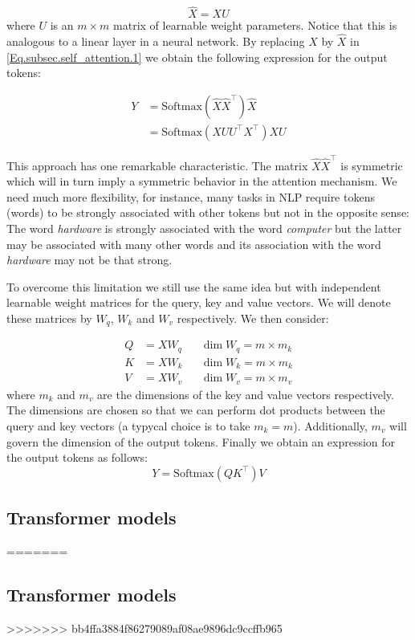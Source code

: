     \[ \widehat{X} = X U \]
    where $U$ is an $m \times m$ matrix of learnable weight parameters. Notice that this is analogous to a linear layer in a neural network. By replacing $X$ by $\widehat{X}$ in \eqref{Eq.subsec.self_attention.1} we obtain the following expression for the output tokens:

    \begin{align}\label{Eq.subsec.self_attention.2}
        Y &= \textrm{Softmax}(\widehat{X} \widehat{X}^\top) \widehat{X} \nonumber \\
        &= \textrm{Softmax}(X U U^\top X^\top) X U 
    \end{align}

    \begin{remark}
        This approach has one remarkable characteristic. The matrix $\widehat{X}\widehat{X}^\top$ is symmetric which will in turn imply a symmetric behavior in the attention mechanism. We need much more flexibility, for instance, many tasks in NLP require tokens (words) to be strongly associated with other tokens but not in the opposite sense: The word \textit{hardware} is strongly associated with the word \textit{computer} but the latter may be associated with many other words and its association with the word \textit{hardware} may not be that strong. 
    \end{remark}

    To overcome this limitation we still use the same idea but with independent learnable weight matrices for the query, key and value vectors. We will denote these matrices by $W_q$, $W_k$ and $W_v$ respectively. We then consider: 

    \begin{align*}
        Q &= X W_q  &&\dim W_q = m\times m_k \\ 
        K &= X W_k  &&\dim W_k = m\times m_k \\
        V &= X W_v &&\dim W_v = m\times m_v
    \end{align*}
    where $m_k$ and $m_v$ are the dimensions of the key and value vectors respectively. The dimensions are chosen so that we can perform dot products between the query and key vectors (a typycal choice is to take $m_k= m$). Additionally, $m_v$ will govern the dimension of the output tokens. Finally we obtain an expression for the output tokens as follows:
    \begin{equation}\label{Eq.subsec.self_attention.3}
        Y = \textrm{Softmax}(Q K^\top) V 
    \end{equation}
    
    \subsection{Transformer models}\label{subsec:transformer_models}
=======




\subsection{Transformer models}\label{subsec:transformer_models}
>>>>>>> bb4ffa3884f86279089af08ae9896dc9ccffb965
